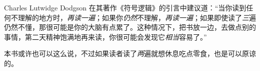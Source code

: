 \clearpage
\thispagestyle{plain}
\onecolumn
\null
\vfill

\parbox{3 in}{
Charles Lutwidge Dodgson 在其著作《符号逻辑》的引言中建议道：“当你读到任何不理解的地方时，\emph{再读一遍}；如果你\emph{仍然}不理解，\emph{再读一遍}；如果即使读了\emph{三}遍仍然不懂，那很可能是你的大脑有点累了。这种情况下，把书放一边，去做点别的事情，第二天精神饱满地再来读，你很可能会发现它\emph{相当}容易了。”

\medskip

本书或许也可以这么说，不过如果读者读了\emph{两}遍就想休息吃点零食，也是可以原谅的。
}

\vfill

\parbox{3 in}{

}
\vfill
